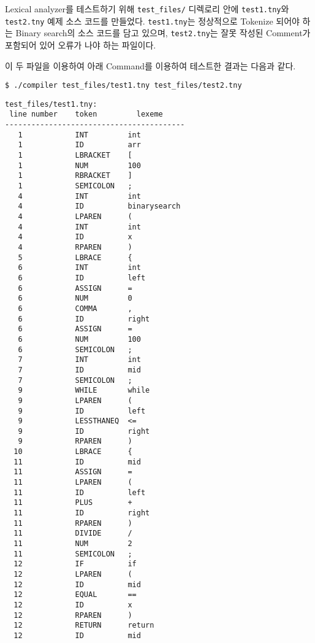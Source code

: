 \documentclass[a4paper, 10pt]{oblivoir}
\begin{document}
Lexical analyzer를 테스트하기 위해 \texttt{test\_files/} 디렉로리 안에 \texttt{test1.tny}와 \texttt{test2.tny} 예제 소스 코드를 만들었다. \texttt{test1.tny}는 정상적으로 Tokenize 되어야 하는 Binary search의 소스 코드를 담고 있으며, \texttt{test2.tny}는 잘못 작성된 Comment가 포함되어 있어 오류가 나야 하는 파일이다.




이 두 파일을 이용하여 아래 Command를 이용하여 테스트한 결과는 다음과 같다.
\begin{lstlisting}
$ ./compiler test_files/test1.tny test_files/test2.tny
\end{lstlisting}

\begin{lstlisting}[caption=Output, frame=single]
test_files/test1.tny:
 line number    token         lexeme    
-----------------------------------------
   1            INT         int
   1            ID          arr
   1            LBRACKET    [
   1            NUM         100
   1            RBRACKET    ]
   1            SEMICOLON   ;
   4            INT         int
   4            ID          binarysearch
   4            LPAREN      (
   4            INT         int
   4            ID          x
   4            RPAREN      )
   5            LBRACE      {
   6            INT         int
   6            ID          left
   6            ASSIGN      =
   6            NUM         0
   6            COMMA       ,
   6            ID          right
   6            ASSIGN      =
   6            NUM         100
   6            SEMICOLON   ;
   7            INT         int
   7            ID          mid
   7            SEMICOLON   ;
   9            WHILE       while
   9            LPAREN      (
   9            ID          left
   9            LESSTHANEQ  <=
   9            ID          right
   9            RPAREN      )
  10            LBRACE      {
  11            ID          mid
  11            ASSIGN      =
  11            LPAREN      (
  11            ID          left
  11            PLUS        +
  11            ID          right
  11            RPAREN      )
  11            DIVIDE      /
  11            NUM         2
  11            SEMICOLON   ;
  12            IF          if
  12            LPAREN      (
  12            ID          mid
  12            EQUAL       ==
  12            ID          x
  12            RPAREN      )
  12            RETURN      return
  12            ID          mid

\end{lstlisting}
\end{document}
